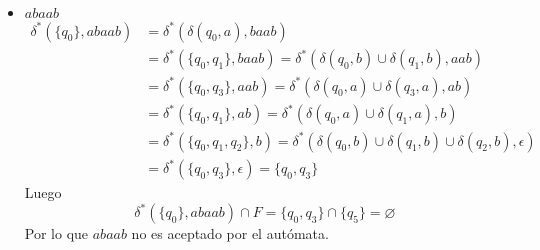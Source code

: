 \documentclass{article}
\begin{document}
\begin{enumerate}
{\begin{itemize}
\begin{enumerate}
{\begin{itemize}
{\begin{align*}
                                    = \{q_{0}, q_{3}, q_{4}, q_{5}\}
                                \end{align*}
                                Luego 
                                \[\delta^{*}(\{q_{0}\}, aabbbb) \cap F = 
                                \{q_{0}, q_{3}, q_{4}, q_{5}\} \cap \{q_{5}\}
                                = \{q_{5}\} \neq \varnothing\]
                                Por lo que $aabbbb$ sí es aceptado por el 
                                autómata.\\
                            }
                            \item {
                                $abaab$
                                \begin{align*}
                                    \delta^{*}(\{q_{0}\}, abaab)
                                    &= \delta^{*}(\delta(q_{0}, a), baab) \\
                                    &= \delta^{*}(\{q_{0}, q_{1}\}, baab) 
                                    = \delta^{*}(\delta(q_{0}, b) 
                                    \cup \delta(q_{1}, b), aab) \\
                                    &= \delta^{*}(\{q_{0}, q_{3}\}, aab) 
                                    = \delta^{*}(\delta(q_{0}, a) 
                                    \cup \delta(q_{3}, a), ab) \\
                                    &= \delta^{*}(\{q_{0}, q_{1}\}, ab) 
                                    = \delta^{*}(\delta(q_{0}, a) 
                                    \cup \delta(q_{1}, a), b) \\
                                    &= \delta^{*}(\{q_{0}, q_{1}, q_{2}\}, b)
                                    = \delta^{*}(\delta(q_{0}, b) 
                                    \cup \delta(q_{1}, b) 
                                    \cup \delta(q_{2}, b), \epsilon) \\
                                    &= \delta^{*}(\{q_{0}, q_{3}\}, \epsilon)
                                    = \{q_{0}, q_{3}\}
                                \end{align*}
                                Luego 
                                \[\delta^{*}(\{q_{0}\}, abaab) \cap F = 
                                \{q_{0}, q_{3}\} \cap \{q_{5}\} = \varnothing\]
                                Por lo que $abaab$ no es aceptado por el 
                                autómata.
                            }
                        \end{itemize}
                    }
                	$  $\\
                	

\end{enumerate}
\end{itemize}}
\end{enumerate}
\end{document}
